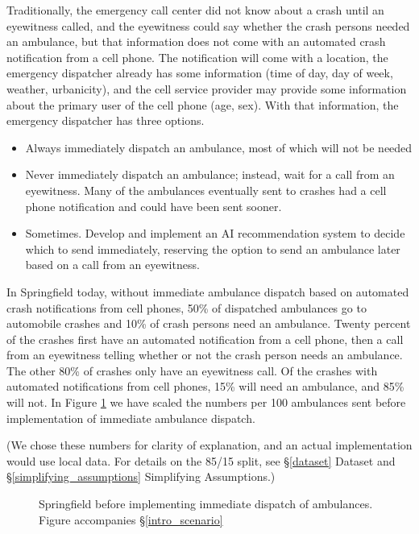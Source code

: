 Traditionally, the emergency call center did not know about a crash until an eyewitness called, and the eyewitness could say whether the crash persons needed an ambulance, but that information does not come with an automated crash notification from a cell phone. The notification will come with a location, the emergency dispatcher already has some information (time of day, day of week, weather, urbanicity), and the cell service provider may provide some information about the primary user of the cell phone (age, sex).  With that information, the emergency dispatcher has three options.

\begin{itemize}
	\item Always immediately dispatch an ambulance, most of which will not be needed
	\item Never immediately dispatch an ambulance; instead, wait for a call from an eyewitness.  Many of the ambulances eventually sent to crashes had a cell phone notification and could have been sent sooner.  
	\item Sometimes.  Develop and implement an AI recommendation system to decide which to send immediately, reserving the option to send an ambulance later based on a call from an eyewitness.  
\end{itemize}


In Springfield today, without immediate ambulance dispatch based on automated crash notifications from cell phones, 50\% of dispatched ambulances go to automobile crashes and 10\% of crash persons need an ambulance.  Twenty percent of the crashes first have an automated notification from a cell phone, then a call from an eyewitness telling whether or not the crash person needs an ambulance.  The other 80\% of crashes only have an eyewitness call.  Of the crashes with automated notifications from cell phones, 15\% will need an ambulance, 
and 85\% will not. 
In Figure \ref{intro_springfield_before} we have scaled the numbers per 100 ambulances sent before implementation of immediate ambulance dispatch.  

(We chose these numbers for clarity of explanation, and an actual implementation would use local data.  For details on the 85/15 split, see \S\ref{dataset} Dataset and \S\ref{simplifying_assumptions} Simplifying Assumptions.)

\begin{figure}[h]
	
\caption{\normalfont\normalsize Springfield before implementing immediate dispatch of ambulances.  Figure accompanies \S\ref{intro_scenario}}
\label{intro_springfield_before}
\end{figure}

